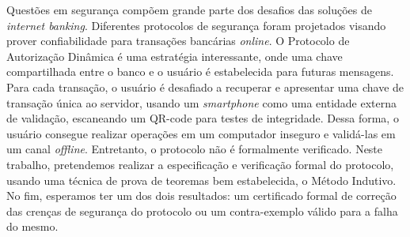 Questões em segurança compõem grande parte dos desafios das soluções de \textit{internet banking}. Diferentes protocolos de segurança foram projetados visando prover confiabilidade para transações bancárias \textit{online}. O Protocolo de Autorização Dinâmica é uma estratégia interessante, onde uma chave compartilhada entre o banco e o usuário é estabelecida para futuras mensagens. Para cada transação, o usuário é desafiado a recuperar e apresentar uma chave de transação única ao servidor, usando um \textit{smartphone} como uma entidade externa de validação, escaneando um QR-code para testes de integridade. Dessa forma, o usuário consegue realizar operações em um computador inseguro e validá-las em um canal \textit{offline}. Entretanto, o protocolo não é formalmente verificado. Neste trabalho, pretendemos realizar a especificação e verificação formal do protocolo, usando uma técnica de prova de teoremas bem estabelecida, o Método Indutivo. No fim, esperamos ter um dos dois resultados: um certificado formal de correção das crenças de segurança do protocolo ou um contra-exemplo válido para a falha do mesmo.
